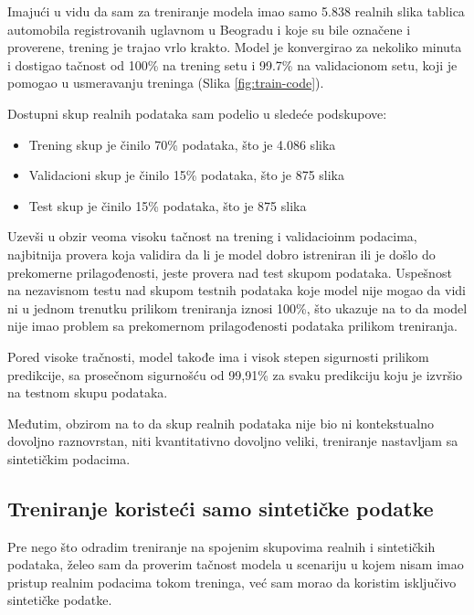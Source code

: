 \documentclass[a4paper,12pt]{article}
\begin{document}
	Imajući u vidu da sam za treniranje modela imao samo 5.838 realnih slika tablica automobila registrovanih uglavnom u Beogradu i koje su bile označene i proverene, trening je trajao vrlo krakto. Model je konvergirao za nekoliko minuta i dostigao tačnost od 100\% na trening setu i 99.7\% na validacionom setu, koji je pomogao u usmeravanju treninga (Slika \ref{fig:train-code}).\newline
		
	Dostupni skup realnih podataka sam podelio u sledeće podskupove:
	\begin{itemize}
		\item Trening skup je činilo 70\% podataka, što je 4.086 slika
		\item Validacioni skup je činilo 15\% podataka, što je 875 slika
		\item Test skup je činilo 15\% podataka, što je 875 slika
	\end{itemize}

	Uzevši u obzir veoma visoku tačnost na trening i validacioinm podacima, najbitnija provera koja validira da li je model dobro istreniran ili je došlo do prekomerne prilagođenosti, jeste provera nad test skupom podataka. Uspešnost na nezavisnom testu nad skupom testnih podataka koje model nije mogao da vidi ni u jednom trenutku prilikom treniranja iznosi 100\%, što ukazuje na to da model nije imao problem sa prekomernom prilagođenosti podataka prilikom treniranja.
	
	
	Pored visoke tračnosti, model takođe ima i visok stepen sigurnosti prilikom predikcije, sa prosečnom sigurnošću od 99,91\% za svaku predikciju koju je izvršio na testnom skupu podataka.
	
	Međutim, obzirom na to da skup realnih podataka nije bio ni kontekstualno dovoljno raznovrstan, niti kvantitativno dovoljno veliki, treniranje nastavljam sa sintetičkim podacima.
	
	\subsection{Treniranje koristeći samo sintetičke podatke}
	Pre nego što odradim treniranje na spojenim skupovima realnih i sintetičkih podataka, želeo sam da proverim tačnost modela u scenariju u kojem nisam imao pristup realnim podacima tokom treninga, već sam morao da koristim isključivo sintetičke podatke.
	
\end{document}
